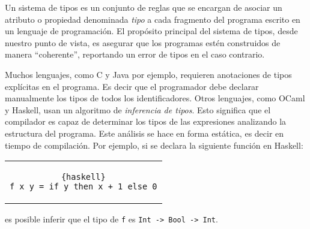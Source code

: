 Un sistema de tipos es un conjunto de
reglas que se encargan de asociar un atributo o propiedad denominada {\em tipo}
a cada fragmento del programa escrito en un lenguaje de programación.
El propósito principal del sistema de tipos, desde nuestro punto de vista,
es asegurar que los programas estén construidos de manera ``coherente'',
reportando un error de tipos en el caso contrario.

Muchos lenguajes, como C y Java por ejemplo, requieren anotaciones de tipos explícitas
en el programa.
Es decir que el programador debe declarar manualmente los tipos de todos los identificadores.
Otros lenguajes, como OCaml y Haskell, usan un algoritmo de {\em inferencia de tipos}.
Esto significa que el compilador es capaz de determinar los tipos de las expresiones
analizando la estructura del programa.
Este análisis se hace en forma estática, es decir en tiempo de compilación.
Por ejemplo, si se declara la siguiente función en Haskell:
\begin{center}
\begin{tabular}{c}
\begin{lstlisting}{haskell}
f x y = if y then x + 1 else 0
\end{lstlisting}
\end{tabular}
\end{center}
es posible inferir que el tipo de
\verb|f| es \verb|Int -> Bool -> Int|.

